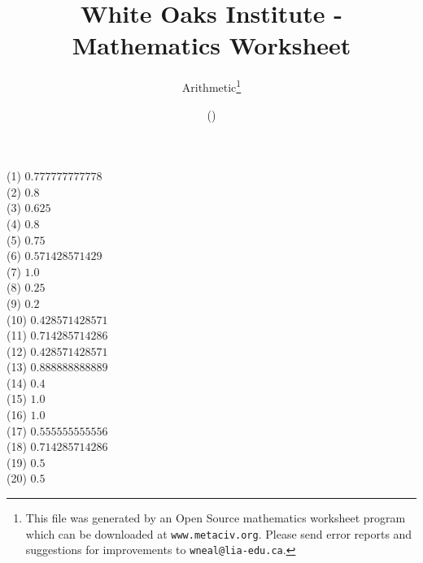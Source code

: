 \documentclass[letter]{article}
\begin{document}
\title{White Oaks Institute - Mathematics Worksheet}
\author{Arithmetic\thanks{This file was generated by an \textsf{Open Source} mathematics worksheet program which can be downloaded at \texttt{www.metaciv.org}. Please send error reports and suggestions for improvements to \texttt{wneal@lia-edu.ca}.}}
\date{\XCfileversion{} (\XCfiledate)}
\maketitle
\setlength{\parskip}{12mm plus 4mm minus 4mm}\setlength{\parindent}{0cm}\begin{multicols}{2}(1) $0.777777777778$\\(2) $0.8$\\(3) $0.625$\\(4) $0.8$\\(5) $0.75$\\(6) $0.571428571429$\\(7) $1.0$\\(8) $0.25$\\(9) $0.2$\\(10) $0.428571428571$\\(11) $0.714285714286$\\(12) $0.428571428571$\\(13) $0.888888888889$\\(14) $0.4$\\(15) $1.0$\\(16) $1.0$\\(17) $0.555555555556$\\(18) $0.714285714286$\\(19) $0.5$\\(20) $0.5$\\\end{multicols}
\end{document}
